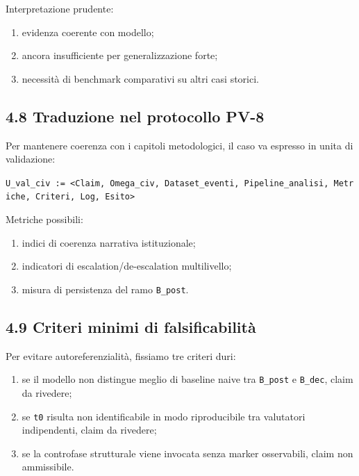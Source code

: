 Interpretazione prudente:

\begin{enumerate}
\def\labelenumi{\arabic{enumi}.}
\tightlist
\item
  evidenza coerente con modello;
\item
  ancora insufficiente per generalizzazione forte;
\item
  necessità di benchmark comparativi su altri casi storici.
\end{enumerate}

\subsection{4.8 Traduzione nel protocollo PV-8}

Per mantenere coerenza con i capitoli metodologici, il caso va espresso in unita di validazione:

\texttt{U\_val\_civ\ :=\ \textless{}Claim,\ Omega\_civ,\ Dataset\_eventi,\ Pipeline\_analisi,\ Metriche,\ Criteri,\ Log,\ Esito\textgreater{}}

Metriche possibili:

\begin{enumerate}
\def\labelenumi{\arabic{enumi}.}
\tightlist
\item
  indici di coerenza narrativa istituzionale;
\item
  indicatori di escalation/de-escalation multilivello;
\item
  misura di persistenza del ramo \texttt{B\_post}.
\end{enumerate}

\subsection{4.9 Criteri minimi di falsificabilità}

Per evitare autoreferenzialità, fissiamo tre criteri duri:

\begin{enumerate}
\def\labelenumi{\arabic{enumi}.}
\tightlist
\item
  se il modello non distingue meglio di baseline naive tra \texttt{B\_post} e \texttt{B\_dec}, claim da rivedere;
\item
  se \texttt{t0} risulta non identificabile in modo riproducibile tra valutatori indipendenti, claim da rivedere;
\item
  se la controfase strutturale viene invocata senza marker osservabili, claim non ammissibile.
\end{enumerate}

